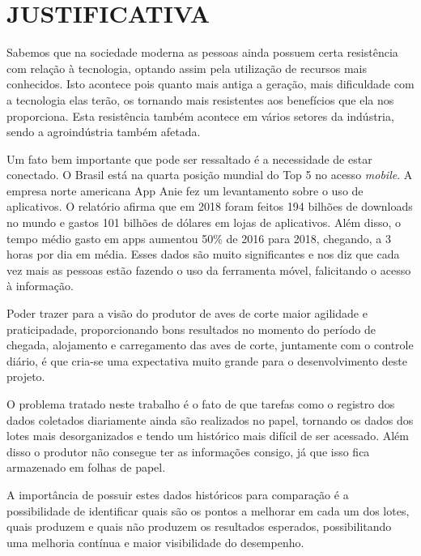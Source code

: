 
\chapter{JUSTIFICATIVA}
\label{chap:justificativa}

Sabemos que na sociedade moderna as pessoas ainda possuem certa resistência com relação à tecnologia, optando assim pela utilização de recursos mais conhecidos. Isto acontece pois quanto mais antiga a geração, mais dificuldade com a tecnologia elas terão, os tornando mais resistentes aos benefícios que ela nos proporciona. Esta resistência também acontece em vários setores da indústria, sendo a agroindústria também afetada. 

Um fato bem importante que pode ser ressaltado é a necessidade de estar conectado. O Brasil está na quarta posição mundial do Top 5 no acesso \textit{mobile}. A empresa norte americana App Anie fez um levantamento sobre o uso de aplicativos.
O relatório afirma que em 2018 foram feitos 194 bilhões de downloads no mundo e gastos 101 bilhões de dólares em lojas de aplicativos. Além disso, o tempo médio gasto em apps aumentou 50\% de 2016 para 2018, chegando, a 3 horas por dia em média. Esses dados são muito significantes e nos diz que cada vez mais as pessoas estão fazendo o uso da ferramenta móvel, falicitando o acesso à informação.

Poder trazer para a visão do produtor de aves de corte maior agilidade e praticipadade, proporcionando bons resultados no momento do período de chegada, alojamento e carregamento das aves de corte, juntamente com o controle diário, é que cria-se uma expectativa muito grande para o desenvolvimento deste projeto.

O problema tratado neste trabalho é o fato de que tarefas como o registro dos dados coletados diariamente ainda são realizados no papel, tornando os dados dos lotes mais desorganizados e tendo um histórico mais difícil de ser acessado. Além disso o produtor não consegue ter as informações consigo, já que isso fica armazenado em folhas de papel.

A importância de possuir estes dados históricos para comparação é a possibilidade de identificar quais são os pontos a melhorar em cada um dos lotes, quais produzem e quais não produzem os resultados esperados, possibilitando uma melhoria contínua e maior visibilidade do desempenho. 
